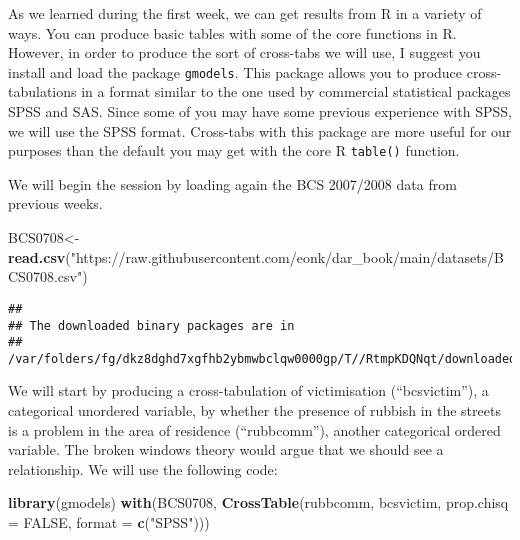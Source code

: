 \documentclass[
]{book}
\newenvironment{Shaded}{\begin{snugshade}}{\end{snugshade}}
\newcommand{\AttributeTok}[1]{\textcolor[rgb]{0.13,0.29,0.53}{#1}}
\newcommand{\ConstantTok}[1]{\textcolor[rgb]{0.56,0.35,0.01}{#1}}
\newcommand{\FunctionTok}[1]{\textcolor[rgb]{0.13,0.29,0.53}{\textbf{#1}}}
\newcommand{\NormalTok}[1]{#1}
\newcommand{\OtherTok}[1]{\textcolor[rgb]{0.56,0.35,0.01}{#1}}
\newcommand{\StringTok}[1]{\textcolor[rgb]{0.31,0.60,0.02}{#1}}
\begin{document}
As we learned during the first week, we can get results from R in a variety of ways. You can produce basic tables with some of the core functions in R. However, in order to produce the sort of cross-tabs we will use, I suggest you install and load the package \texttt{gmodels}. This package allows you to produce cross-tabulations in a format similar to the one used by commercial statistical packages SPSS and SAS. Since some of you may have some previous experience with SPSS, we will use the SPSS format. Cross-tabs with this package are more useful for our purposes than the default you may get with the core R \texttt{table()} function.

We will begin the session by loading again the BCS 2007/2008 data from previous weeks.

\begin{Shaded}
\begin{Highlighting}[]
\NormalTok{BCS0708}\OtherTok{\textless{}{-}}\FunctionTok{read.csv}\NormalTok{(}\StringTok{"https://raw.githubusercontent.com/eonk/dar\_book/main/datasets/BCS0708.csv"}\NormalTok{)}
\end{Highlighting}
\end{Shaded}

\begin{verbatim}
## 
## The downloaded binary packages are in
##  /var/folders/fg/dkz8dghd7xgfhb2ybmwbclqw0000gp/T//RtmpKDQNqt/downloaded_packages
\end{verbatim}

We will start by producing a cross-tabulation of victimisation (``bcsvictim''), a categorical unordered variable, by whether the presence of rubbish in the streets is a problem in the area of residence (``rubbcomm''), another categorical ordered variable. The broken windows theory would argue that we should see a relationship. We will use the following code:

\begin{Shaded}
\begin{Highlighting}[]
\FunctionTok{library}\NormalTok{(gmodels)}
\FunctionTok{with}\NormalTok{(BCS0708, }\FunctionTok{CrossTable}\NormalTok{(rubbcomm, bcsvictim, }\AttributeTok{prop.chisq =} \ConstantTok{FALSE}\NormalTok{, }\AttributeTok{format =} \FunctionTok{c}\NormalTok{(}\StringTok{"SPSS"}\NormalTok{)))}
\end{Highlighting}
\end{Shaded}
\end{document}
